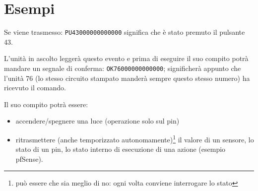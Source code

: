\documentclass[italian]{article}
\begin{document}
    \section*{Esempi}
    
    Se viene trasmesso: \texttt{PU43000000000000} significa che è stato premuto il pulsante 43.
    
    L'unità in ascolto leggerà questo evento e prima di eseguire il suo compito  potrà mandare un segnale di conferma: \texttt{OK76000000000000}; significherà appunto che l'unità 76 (lo stesso circuito stampato manderà sempre questo stesso numero) ha ricevuto il comando.
    
    Il suo compito potrà essere:
    
    \begin{itemize}
        \item accendere/spegnere una luce (operazione solo sul pin)
        \item ritrasmettere (anche temporizzato autonomamente)\footnote{può essere che sia meglio di no: ogni volta conviene interrogare lo stato} il valore di un sensore, lo stato di un pin, lo stato interno di esecuzione di una azione (esempio pfSense).
    \end{itemize}
    
\end{document}
